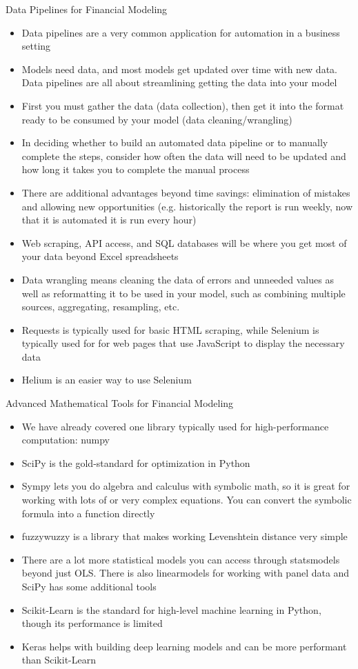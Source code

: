 \documentclass[]{article}
\begin{document}
\begin{section}{Data Pipelines for Financial Modeling}
\begin{itemize}
\item Data pipelines are a very common application for automation in a business setting
\item Models need data, and most models get updated over time with new data. Data pipelines are all about streamlining getting the data into your model
\item First you must gather the data (data collection), then get it into the format ready to be consumed by your model (data cleaning/wrangling)
\item In deciding whether to build an automated data pipeline or to manually complete the steps, consider how often the data will need to be updated and how long it takes you to complete the manual process
\item There are additional advantages beyond time savings: elimination of mistakes and allowing new opportunities (e.g. historically the report is run weekly, now that it is automated it is run every hour)
\item Web scraping, API access, and SQL databases will be where you get most of your data beyond Excel spreadsheets
\item Data wrangling means cleaning the data of errors and unneeded values as well as reformatting it to be used in your model, such as combining multiple sources, aggregating, resampling, etc.
\item Requests is typically used for basic HTML scraping, while Selenium is typically used for for web pages that use JavaScript to display the necessary data
\item Helium is an easier way to use Selenium
\end{itemize}
\end{section}
\begin{section}{Advanced Mathematical Tools for Financial Modeling}
\begin{itemize}
\item We have already covered one library typically used for high-performance computation: numpy
\item SciPy is the gold-standard for optimization in Python
\item Sympy lets you do algebra and calculus with symbolic math, so it is great for working with lots of or very complex equations. You can convert the symbolic formula into a function directly
\item fuzzywuzzy is a library that makes working Levenshtein distance very simple
\item There are a lot more statistical models you can access through statsmodels beyond just OLS. There is also linearmodels for working with panel data and SciPy has some additional tools
\item Scikit-Learn is the standard for high-level machine learning in Python, though its performance is limited
\item Keras helps with building deep learning models and can be more performant than Scikit-Learn
\end{itemize}
\end{section}
\end{document}
